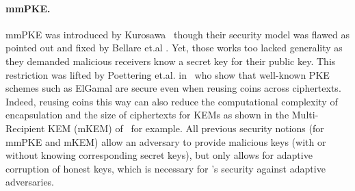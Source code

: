 %


\paragraph{mmPKE.}
mmPKE was introduced by Kurosawa~\cite{PKC:Kurosawa02} though their
security model was flawed as pointed out and fixed by Bellare et.al
\cite{PKC:BelBolSta03,IEEE:BelBolKur07}. Yet, those works too lacked
generality as they demanded malicious receivers know a secret key for their
public key. This restriction was lifted by Poettering et.al.
in~\cite{ASIACCS:PinPoeSch14} who show that well-known PKE schemes such as
ElGamal\cite{C:ElGamal84} are secure even
when reusing coins across ciphertexts. Indeed, reusing coins this way can
also reduce the computational complexity of encapsulation and the size of
ciphertexts for KEMs as shown in the Multi-Recipient KEM (mKEM)
of~\cite{SCN:Smart04,ICICS:CLQY18a,AC:KKPP20} for example.
%
All previous security notions (for mmPKE and mKEM) allow an adversary to
provide malicious keys (with or without knowing corresponding secret keys),
but only \cite{hashimoto2021cmpke} allows for adaptive corruption of honest keys, which is necessary for
\protITK's security against adaptive adversaries.


